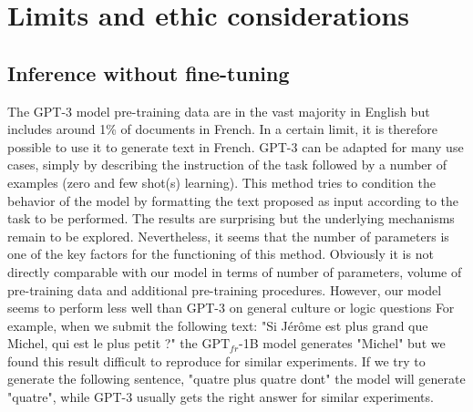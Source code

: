 \section{Limits and ethic considerations}

\subsection{Inference without fine-tuning}  

The GPT-3 model \parencite{brown_20} pre-training data are in the vast majority in English but includes around 1\% of documents in French. In a certain limit, it is therefore possible to use it to generate text in French. GPT-3 can be adapted for many use cases, simply by describing the instruction of the task followed by a number of examples (zero and few shot(s) learning). This method tries to condition the behavior of the model by formatting the text proposed as input according to the task to be performed. The results are surprising but the underlying mechanisms remain to be explored. Nevertheless, it seems that the number of parameters is one of the key factors for the functioning of this method. Obviously it is not directly comparable with our model in terms of number of parameters, volume of pre-training data and additional pre-training procedures. However, our model seems to perform less well than GPT-3 on general culture or logic questions
For example, when we submit the following text: "Si Jérôme est plus grand que Michel, qui est le plus petit ?"
the $\text{GPT}_{fr}$-1B model generates "Michel" but we found this result difficult to reproduce for similar experiments. If we try to generate the following sentence, "quatre plus quatre dont" the model will generate "quatre", while GPT-3 usually gets the right answer for similar experiments.

